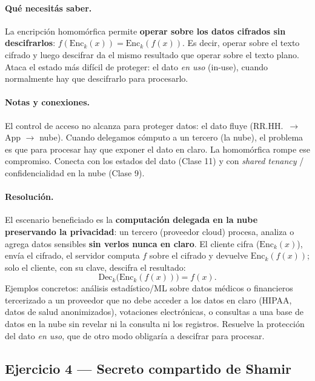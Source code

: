 \paragraph{Qué necesitás saber.}
La encripción homomórfica permite \textbf{operar sobre los datos cifrados sin descifrarlos}:
$f(\mathrm{Enc}_k(x)) = \mathrm{Enc}_k(f(x))$. Es decir, operar sobre el texto cifrado y
luego descifrar da el mismo resultado que operar sobre el texto plano. Ataca el estado más
difícil de proteger: el dato \emph{en uso} (in-use), cuando normalmente hay que descifrarlo
para procesarlo.

\paragraph{Notas y conexiones.}
El control de acceso no alcanza para proteger datos: el dato fluye (RR.HH.\ $\to$ App $\to$
nube). Cuando delegamos cómputo a un tercero (la nube), el problema es que para procesar hay
que exponer el dato en claro. La homomórfica rompe ese compromiso. Conecta con los estados
del dato (Clase 11) y con \emph{shared tenancy} / confidencialidad en la nube (Clase 9).

\paragraph{Resolución.}
El escenario beneficiado es la \textbf{computación delegada en la nube preservando la
privacidad}: un tercero (proveedor cloud) procesa, analiza o agrega datos sensibles
\textbf{sin verlos nunca en claro}. El cliente cifra ($\mathrm{Enc}_k(x)$), envía el cifrado,
el servidor computa $f$ sobre el cifrado y devuelve $\mathrm{Enc}_k(f(x))$; solo el cliente,
con su clave, descifra el resultado:
\begin{equation*}
\mathrm{Dec}_k\big(\mathrm{Enc}_k(f(x))\big) = f(x).
\end{equation*}
Ejemplos concretos: análisis estadístico/ML sobre datos médicos o financieros tercerizado a
un proveedor que no debe acceder a los datos en claro (HIPAA, datos de salud anonimizados),
votaciones electrónicas, o consultas a una base de datos en la nube sin revelar ni la consulta
ni los registros. Resuelve la protección del dato \emph{en uso}, que de otro modo obligaría a
descifrar para procesar.

\subsection{Ejercicio 4 --- Secreto compartido de Shamir}


